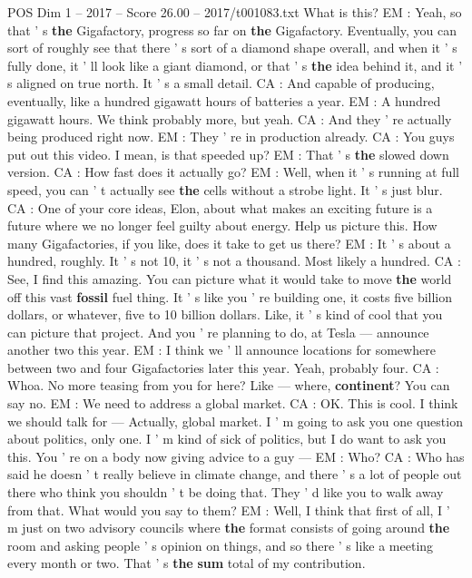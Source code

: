 \begin{textsample}{POS Dim 1 – 2017 – Score 26.00 – 2017/t001083.txt}
What is this?
EM : Yeah, so that ' s \textbf{the} Gigafactory, progress so far on \textbf{the} Gigafactory.
Eventually, you can sort of roughly see that there ' s sort of a diamond shape overall, and when it ' s fully done, it ' ll look like a giant diamond, or that ' s \textbf{the} idea behind it, and it ' s aligned on true north.
It ' s a small detail.
CA : And capable of producing, eventually, like a hundred gigawatt hours of batteries a year.
EM : A hundred gigawatt hours.
We think probably more, but yeah.
CA : And they ' re actually being produced right now.
EM : They ' re in production already.
CA : You guys put out this video.
I mean, is that speeded up?
EM : That ' s \textbf{the} slowed down version.
CA : How fast does it actually go?
EM : Well, when it ' s running at full speed, you can ' t actually see \textbf{the} cells without a strobe light.
It ' s just blur.
CA : One of your core ideas, Elon, about what makes an exciting future is a future where we no longer feel guilty about energy.
Help us picture this.
How many Gigafactories, if you like, does it take to get us there?
EM : It ' s about a hundred, roughly.
It ' s not 10, it ' s not a thousand.
Most likely a hundred.
CA : See, I find this amazing.
You can picture what it would take to move \textbf{the} world off this vast \textbf{fossil} fuel thing.
It ' s like you ' re building one, it costs five billion dollars, or whatever, five to 10 billion dollars.
Like, it ' s kind of cool that you can picture that project.
And you ' re planning to do, at Tesla — announce another two this year.
EM : I think we ' ll announce locations for somewhere between two and four Gigafactories later this year.
Yeah, probably four.
CA : Whoa.
No more teasing from you for here?
Like — where, \textbf{continent}?
You can say no.
EM : We need to address a global market.
CA : OK.
This is cool.
I think we should talk for — Actually, global market.
I ' m going to ask you one question about politics, only one.
I ' m kind of sick of politics, but I do want to ask you this.
You ' re on a body now giving advice to a guy — EM : Who?
CA : Who has said he doesn ' t really believe in climate change, and there ' s a lot of people out there who think you shouldn ' t be doing that.
They ' d like you to walk away from that.
What would you say to them?
EM : Well, I think that first of all, I ' m just on two advisory councils where \textbf{the} format consists of going around \textbf{the} room and asking people ' s opinion on things, and so there ' s like a meeting every month or two.
That ' s \textbf{the} \textbf{sum} total of my contribution.

\end{textsample}
